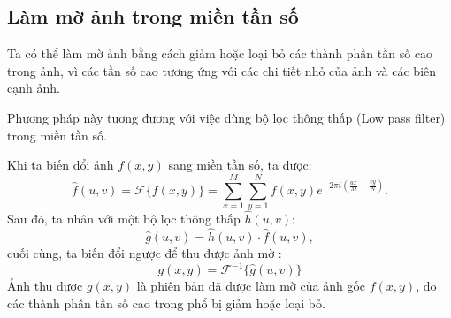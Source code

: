 \documentclass[12pt,a4paper]{report}
\numberwithin{equation}{section}
\theoremstyle{definition} %
\begin{document}











\subsection{Làm mờ ảnh trong miền tần số}







Ta có thể làm mờ ảnh bằng cách giảm hoặc loại bỏ các thành phần tần số cao trong ảnh, vì các tần số cao tương ứng với các chi tiết nhỏ của ảnh và các biên cạnh ảnh.

Phương pháp này tương đương với việc dùng bộ lọc thông thấp (Low pass filter) trong miền tần số.

Khi ta biến đổi ảnh $f(x,y)$ sang miền tần số, ta được: 
\begin{equation}
	\label{141}
	\hat{f}(u,v) = \mathcal{F}\{f(x,y)\} = \sum_{x=1}^{M}\sum_{y=1}^{N} f(x,y)e^{-2\pi i\left(\frac{ux}{M}+\frac{vy}{N}\right)}.
\end{equation}
Sau đó, ta nhân với một bộ lọc thông thấp $\hat{h}(u,v)$: 
\begin{equation}
\label{142}
\hat{g}(u,v) = \hat{h}(u,v)\cdot\hat{f}(u,v),
\end{equation}
cuối cùng, ta biến đổi ngược để thu được ảnh mờ : 
\begin{equation}
\label{143}
g(x,y) = \mathcal{F}^{-1}\{\hat{g}(u,v)\}
\end{equation}
Ảnh thu được $g(x,y)$ là phiên bản đã được làm mờ của ảnh gốc $f(x,y)$, do các thành phần tần số cao trong phổ bị giảm hoặc loại bỏ. 
\end{document}
